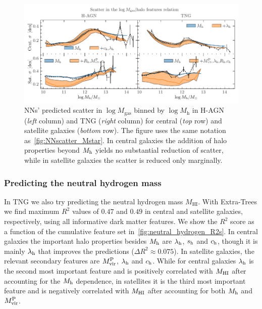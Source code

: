 \documentclass[usenatbib,useAMS]{mnras}
\begin{document}
\begin{figure}
    \centering
    \includegraphics[width=\textwidth]{Figures/NN_scatter_mgas.pdf}
    \caption{\acp{NN}' predicted scatter in $\log M_\mathrm{gas}$ binned by $\log M_\mathrm{h}$ in H-AGN (\emph{left} column) and TNG (\emph{right} column) for central (\emph{top} row) and satellite galaxies (\emph{bottom} row). The figure uses the same notation as~\cref{fig:NNscatter_Mstar}. In central galaxies the addition of halo properties beyond $M_{\rm h}$ yields no substantial reduction of scatter, while in satellite galaxies the scatter is reduced only marginally.}
    \label{fig:NNscatter_Mgas}
\end{figure}


\subsubsection{Predicting the neutral hydrogen mass}

In TNG we also try predicting the neutral hydrogen mass $M_\mathrm{HI}$. With Extra-Trees we find maximum $R^2$ values of $0.47$ and $0.49$ in central and satellite galaxies, respectively, using all informative dark matter features. We show the $R^2$ score as a function of the cumulative feature set in~\cref{fig:neutral_hydrogen_R2s}.
In central galaxies the important halo properties besides $M_{\rm h}$ are $\lambda_{\rm h}$, $s_{\rm h}$ and $c_{\rm h}$, though it is mainly  $\lambda_{\rm h}$ that improves the predictions ($\Delta R^2 \approx 0.075$). In satellite galaxies, the relevant secondary features are $M_{\rm vir}^{\rm P}$, $\lambda_{\rm h}$ and $c_{\rm h}$. While for central galaxies $\lambda_{\rm h}$ is the second most important feature and is positively correlated with $M_{\rm HI}$ after accounting for the $M_{\rm h}$ dependence, in satellites it is the third most important feature and is negatively correlated with $M_{\rm HI}$ after accounting for both $M_{\rm h}$ and $M_{\rm vir}^{\rm P}$.
\end{document}
